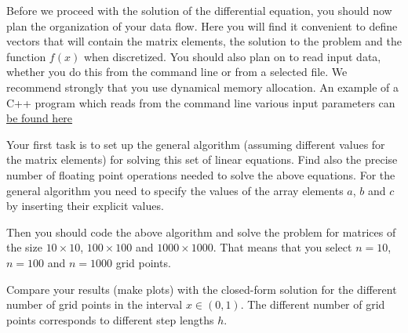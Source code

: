 \documentclass[%
oneside,                 %
final,                   %
10pt]{article}
\begin{document}
Before we proceed with the solution of the differential equation, you should now plan the organization of your data flow. Here you will find it convenient to define vectors that will contain the matrix elements, the solution to the problem and the function $f(x)$ when discretized. You should also plan on to read input data, whether you do this from the command line or from a selected file. We recommend strongly that you use dynamical memory allocation.
An example of a C++ program which reads from the command line various input parameters can \href{{https://github.com/CompPhysics/ComputationalPhysicsMSU/blob/master/doc/Projects/2018/Project1/CodeExamples/TridiagonalSimple.cpp}}{be found here}

Your first task is to set up the general algorithm (assuming different
values for the matrix elements) for solving this set of linear
equations.  Find also the precise number of floating point operations
needed to solve the above equations. For the general algorithm you
need to specify the values of the array elements $a$, $b$ and $c$ by
inserting their explicit values.


Then you should code the above algorithm and solve the problem for matrices of the size
$10\times 10$, $100\times 100$ and $1000\times 1000$.  That means that you select $n=10$, $n=100$ and
$n=1000$ grid points. 

Compare your results (make plots) with the closed-form solution for the different number of grid points  in the 
interval $x\in(0,1)$.  The different number of grid points corresponds to different step lengths $h$.
\end{document}
